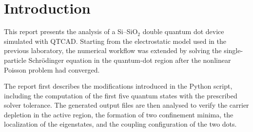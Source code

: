 \chapter{Introduction}
This report presents the analysis of a Si--SiO$_2$ double quantum dot device
simulated with QTCAD. Starting from the electrostatic model used in the
previous laboratory, the numerical workflow was extended by solving the
single-particle Schr\"odinger equation in the quantum-dot region after the
nonlinear Poisson problem had converged.

The report first describes the modifications introduced in the Python script,
including the computation of the first five quantum states with the prescribed
solver tolerance. The generated output files are then analysed to verify the
carrier depletion in the active region, the formation of two confinement
minima, the localization of the eigenstates, and the coupling configuration of
the two dots.
